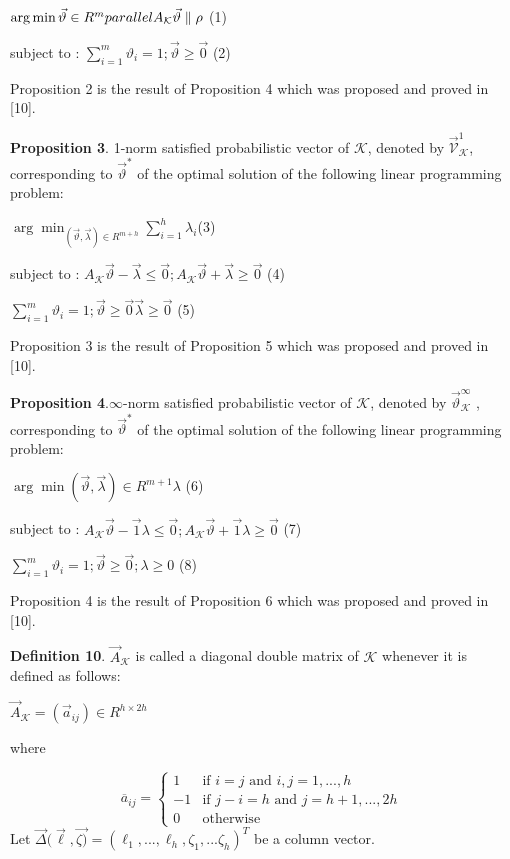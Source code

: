 \documentclass[]{iosart2c}
\begin{document}
    $\arg \min\vec{\vartheta}\in R^m\\parallel A_\mathcal{K} \vec{\vartheta}\parallel\rho$ (1)

    subject to : $\sum^m_{i=1}\vartheta_i = 1; \vec{\vartheta}\geq\vec{0}$ (2)

    Proposition 2 is the result of Proposition 4 which was proposed and proved in [10].

    \textbf{Proposition 3}. 1-norm satisfied probabilistic vector of $\mathcal{K}$, denoted by $\vec{\mathcal{V}}^1_\mathcal{K}$, corresponding to $\vec{\vartheta}^*$ of the optimal solution of the following linear programming problem:

    $\arg \min _{(\vec{\vartheta},\vec{\lambda}) \in R^{m+h}} \sum^h_{i=1}\lambda_i$(3)

    subject to : $A_\mathcal{K} \vec{\vartheta} - \vec{\lambda} \le \vec{0}; A_\mathcal{K}\vec{\vartheta} + \vec{\lambda}\geq\vec{0}$ (4)

    $\sum^m_{i=1} \vartheta_i = 1; \vec{\vartheta}\geq\vec{0}    \vec{\lambda}\geq \vec{0}$ (5)

    Proposition 3 is the result of Proposition 5 which was proposed and proved in [10].

    \textbf{Proposition 4}.$\infty$-norm satisfied probabilistic vector of $\mathcal{K}$, denoted by $\vec{\vartheta}^\infty_\mathcal{K}$ , corresponding to $\vec{\vartheta}^*$ of the optimal solution of the following linear programming problem:

    $\arg \min(\vec{\vartheta},\vec{\lambda}) \in R^{m+1}\lambda$ (6)

    subject to : $A_\mathcal{K}\vec{\vartheta} -\vec{1}\lambda \le \vec{0}; A_\mathcal{K}\vec{\vartheta} +\vec{1}\lambda \geq \vec{0}$ (7)

    $\sum^m_{i=1} \vartheta_i = 1; \vec{\vartheta}\geq\vec{0}; \lambda\geq 0$ (8)

    Proposition 4 is the result of Proposition 6 which was proposed and proved in [10].

    \textbf{Definition 10}. $\vec{A}_\mathcal{K}$ is called a diagonal double matrix of $\mathcal{K}$ whenever it is defined as follows:

    $\vec{A}_\mathcal{K} = (\vec{a}_{ij}) \in R^{h \times 2h}$

    where

    $$\overline{a}_{ij} =
    \begin{cases}
        1        &\text{if $i = j$ and $i, j = 1, ... , h$}\\
        -1    &\text{if $j - i = h$ and $j = h + 1, ... , 2h$}\\
        0        &\text{otherwise}
    \end{cases}
    $$
    Let $\vec{\Delta}(\vec{\ell},\vec{\zeta)} = (\ell_1, ..., \ell_h, \zeta_1, ...\zeta_h)^T$ be a column vector.
\end{document}
